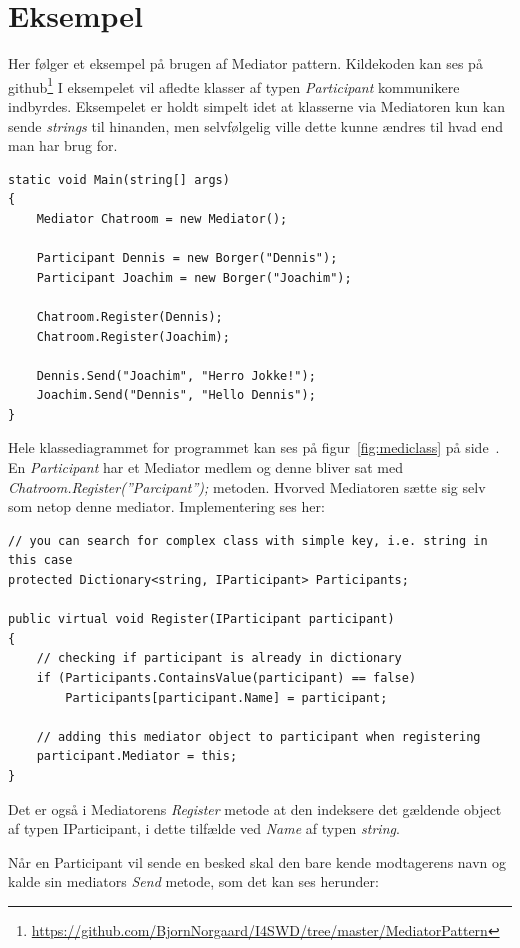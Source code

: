 \section{Eksempel}
Her følger et eksempel på brugen af Mediator pattern. Kildekoden kan ses på github\footnote{\url{https://github.com/BjornNorgaard/I4SWD/tree/master/MediatorPattern}} I eksempelet vil afledte klasser af typen \textit{Participant} kommunikere indbyrdes. Eksempelet er holdt simpelt idet at klasserne via Mediatoren kun kan sende \textit{strings} til hinanden, men selvfølgelig ville dette kunne ændres til hvad end man har brug for.

\begin{lstlisting}
static void Main(string[] args)
{
	Mediator Chatroom = new Mediator();
	
	Participant Dennis = new Borger("Dennis");
	Participant Joachim = new Borger("Joachim");
	
	Chatroom.Register(Dennis);
	Chatroom.Register(Joachim);
	
	Dennis.Send("Joachim", "Herro Jokke!");
	Joachim.Send("Dennis", "Hello Dennis");
}
\end{lstlisting}

Hele klassediagrammet for programmet kan ses på figur~\ref{fig:mediclass} på side~\pageref{fig:mediclass}. En \textit{Participant} har et Mediator medlem og denne bliver sat med \textit{Chatroom.Register(''Parcipant'');} metoden. Hvorved Mediatoren sætte sig selv som netop denne mediator. Implementering ses her:

\begin{lstlisting}
// you can search for complex class with simple key, i.e. string in this case
protected Dictionary<string, IParticipant> Participants;

public virtual void Register(IParticipant participant)
{
	// checking if participant is already in dictionary
	if (Participants.ContainsValue(participant) == false)
		Participants[participant.Name] = participant;
	
	// adding this mediator object to participant when registering
	participant.Mediator = this;
}
\end{lstlisting}

Det er også i Mediatorens \textit{Register} metode at den indeksere det gældende object af typen IParticipant, i dette tilfælde ved \textit{Name} af typen \textit{string}. 

Når en Participant vil sende en besked skal den bare kende modtagerens navn og kalde sin mediators \textit{Send} metode, som det kan ses herunder:

